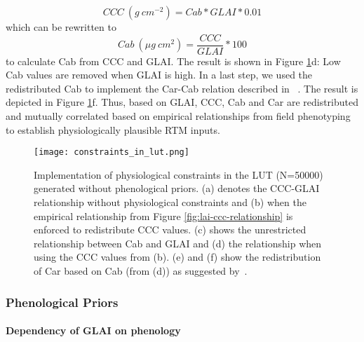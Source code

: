 \begin{equation}
\label{eq:ccc-calc-rtm}
    CCC\ (g\ cm^{-2}) = Cab * GLAI * 0.01
\end{equation}
which can be rewritten to
\begin{equation}
\label{eq:ccc-calc-rtm_inv}
    Cab\ (\mu g\ cm^{2}) = \frac{CCC}{GLAI} * 100
\end{equation}
to calculate Cab from CCC and GLAI. The result is shown in Figure \ref{fig:constraints-in-lut}d: Low Cab values are removed when GLAI is high. In a last step, we used the redistributed Cab to implement the Car-Cab relation described in ~\cite{wocher_rtm-based_2020}. The result is depicted in Figure \ref{fig:constraints-in-lut}f. Thus, based on GLAI, CCC, Cab and Car are redistributed and mutually correlated based on empirical relationships from field phenotyping to establish physiologically plausible RTM inputs.

\begin{figure}[H]
    \centering
    \texttt{[image: constraints\_in\_lut.png]}
    \caption[Implementation of physiological constraints in the LUT (N=50000) generated without phenological priors. (a) denotes the CCC-GLAI relationship without physiological constraints and (b) when the empirical relationship from Figure \ref{fig:lai-ccc-relationship} is enforced to redistribute CCC values. (c) shows the unrestricted relationship between Cab and GLAI and (d) the relationship when using the CCC values from (b). (e) and (f) show the redistribution of Car based on Cab (from (d)) as suggested by~\cite{wocher_rtm-based_2020}.]{Implementation of physiological constraints in the LUT (N=50000) generated without phenological priors. (a) denotes the CCC-GLAI relationship without physiological constraints and (b) when the empirical relationship from Figure \ref{fig:lai-ccc-relationship} is enforced to redistribute CCC values. (c) shows the unrestricted relationship between Cab and GLAI and (d) the relationship when using the CCC values from (b). (e) and (f) show the redistribution of Car based on Cab (from (d)) as suggested by~\cite{wocher_rtm-based_2020}.}
    \label{fig:constraints-in-lut}
\end{figure}


\subsubsection{Phenological Priors}
\label{subsubsec:phenological-constraints}
\paragraph{Dependency of GLAI on phenology}

